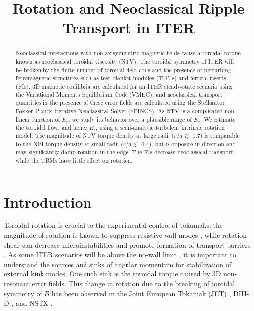 \documentclass{article}
\title{Rotation and Neoclassical Ripple Transport in ITER}
\numberwithin{figure}{section}
\numberwithin{equation}{section}
\begin{document}
\maketitle

\begin{abstract}

Neoclassical interactions with non-axisymmetric magnetic fields cause a toroidal torque known as neoclassical toroidal viscosity (NTV). The toroidal symmetry of ITER will be broken by the finite number of toroidal field coils and the presence of perturbing ferromagnetic structures such as test blanket modules (TBMs) and ferritic inserts (FIs). 3D magnetic equilibria are calculated for an ITER steady-state scenario using the Variational Moments Equilibrium Code (VMEC), and neoclassical transport quantities in the presence of these error fields are calculated using the Stellarator Fokker-Planck Iterative Neoclassical Solver (SFINCS). As NTV is a complicated non-linear function of $E_r$, we study its behavior over a plausible range of $E_r$. We estimate the toroidal flow, and hence $E_r$, using a semi-analytic turbulent intrinsic rotation model. The magnitude of NTV torque density at large radii ($r/a \gtrsim$ 0.7) is comparable to the NBI torque density at small radii ($r/a \lesssim$ 0.4), but is opposite in direction and may significantly damp rotation in the edge. The FIs decrease neoclassical transport, while the TBMs have little effect on rotation. 
\end{abstract}

\section{Introduction}

Toroidal rotation is crucial to the experimental control of tokamaks: the magnitude of rotation is known to suppress resistive wall modes \cite{Bondeson1994, Garofalo2002}, while rotation shear can decrease microinstabilities and promote formation of transport barriers \cite{Burrell1997, Terry2000}. As some ITER scenarios will be above the no-wall limit \cite{Liu2004}, it is important to understand the sources and sinks of angular momentum for stabilization of external kink modes. One such sink is the toroidal torque caused by 3D non-resonant error fields. This change in rotation due to the breaking of toroidal symmetry of $B$ has been observed in the Joint European Tokamak (JET) \cite{Lazzaro2002, DeVries2008}, DIII-D \cite{Garofalo2008}, and NSTX \cite{Zhu2006}. 
\end{document}
